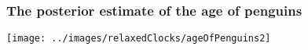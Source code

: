 \begin{frame}
\frametitle{The posterior estimate of the age of penguins}

\begin{centering}

\texttt{[image: ../images/relaxedClocks/ageOfPenguins2]}

\end{centering}

\end{frame}